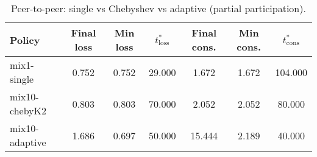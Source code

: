 \begin{table}[t]
\centering
\begin{tabular}{lcccccc}
\toprule
Policy & Final loss & Min loss & $t^*_{\text{loss}}$ & Final cons. & Min cons. & $t^*_{\text{cons}}$ \\
\midrule
mix1-single & 0.752 & 0.752 & 29.000 & 1.672 & 1.672 & 104.000 \\
mix10-chebyK2 & 0.803 & 0.803 & 70.000 & 2.052 & 2.052 & 80.000 \\
mix10-adaptive & 1.686 & 0.697 & 50.000 & 15.444 & 2.189 & 40.000 \\
\bottomrule
\end{tabular}
\caption{Peer-to-peer: single vs Chebyshev vs adaptive (partial participation).}
\label{tab:peer}
\end{table}